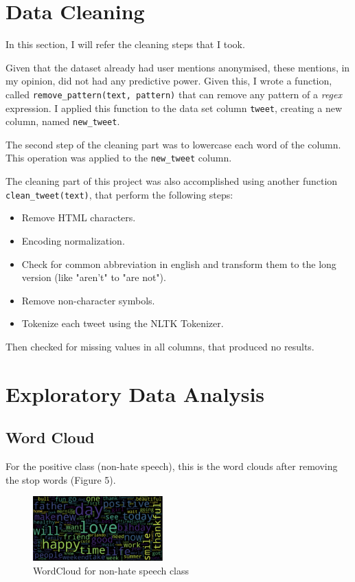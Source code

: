 \documentclass{article}
\begin{document}
	\section{Data Cleaning}
	
	In this section, I will refer the cleaning steps that I took.
	
	Given that the dataset already had user mentions anonymised, these mentions, in my opinion, did not had any predictive power. Given this, I wrote a function, called \texttt{remove\_pattern(text, pattern)} that can remove any pattern of a \textit{regex} expression. I applied this function to the data set column \texttt{tweet}, creating a new column, named \texttt{new\_tweet}.
	
	The second step of the cleaning part was to lowercase each word of the column. This operation was applied to the \texttt{new\_tweet} column. 
	
	The cleaning part of this project was also accomplished using another function \texttt{clean\_tweet(text)}, that perform the following steps:
	\begin{itemize}
		\item Remove HTML characters.
		\item Encoding normalization.
		\item Check for common abbreviation in english and transform them to the long version (like "aren't" to "are not").
		\item Remove non-character symbols.
		\item Tokenize each tweet using the NLTK Tokenizer.
	\end{itemize}
	
	Then checked for missing values in all columns, that produced no results. 
	
	\section{Exploratory Data Analysis}
	
	\subsection{Word Cloud}
	
	For the positive class (non-hate speech), this is the word clouds after removing the stop words (Figure 5).
	
	\begin{figure}[h]
		\label{Figure 5}
		\caption{WordCloud for non-hate speech class}
		\includegraphics[width=50mm]{wordpos.png}
		\centering
	\end{figure}
	
\end{document}
